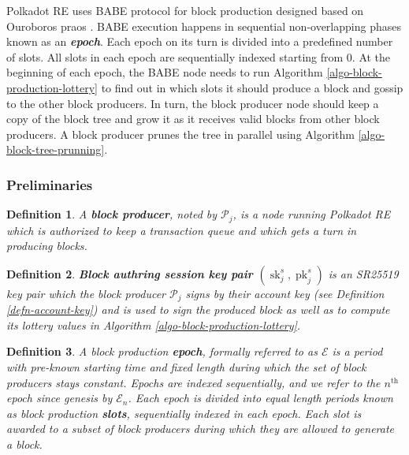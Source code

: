 \documentclass{article}
\newcommand{\tmem}[1]{{\em #1\/}}
\newcommand{\tmop}[1]{\ensuremath{\operatorname{#1}}}
\newcommand{\tmstrong}[1]{\textbf{#1}}
\newcommand{\tmtextbf}[1]{{\bfseries{#1}}}
\newcommand{\tmtextit}[1]{{\itshape{#1}}}
\newtheorem{definition}{Definition}
\providecommand{\tmem}[1]{\tmtextit{#1}}
\providecommand{\tmop}[1]{\ensuremath{\mathrm{#1}}}
\providecommand{\tmstrong}[1]{\tmtextbf{#1}}
\providecommand{\tmtextbf}[1]{\tmtextbf{#1}}
\providecommand{\tmtextit}[1]{\tmtextit{#1}}
\newtheorem{definition}{Definition}
\begin{document}
Polkadot RE uses BABE protocol {\cite{w3f_research_group_blind_2019}} for
block production designed based on Ouroboros praos
{\cite{david_ouroboros_2018}}. BABE execution happens in sequential
non-overlapping phases known as an {\tmstrong{{\tmem{epoch}}}}. Each epoch on
its turn is divided into a predefined number of slots. All slots in each epoch
are sequentially indexed starting from 0. At the beginning of each epoch, the
BABE node needs to run Algorithm \ref{algo-block-production-lottery} to find
out in which slots it should produce a block and gossip to the other block
producers. In turn, the block producer node should keep a copy of the block
tree and grow it as it receives valid blocks from other block producers. A
block producer prunes the tree in parallel using Algorithm
\ref{algo-block-tree-prunning}.

\subsubsection{Preliminaries}

\begin{definition}
  A {\tmstrong{block producer}}, noted by $\mathcal{P}_j$, is a node running
  Polkadot RE which is authorized to keep a transaction queue and which gets a
  turn in producing blocks.
\end{definition}

\begin{definition}
  {\tmstrong{Block authring session key pair $(\tmop{sk}^s_j,
  \tmop{pk}^s_j)$}} is an SR25519 key pair which the block producer
  $\mathcal{P}_j$ signs by their account key (see Definition
  \ref{defn-account-key}) and is used to sign the produced block as well as to
  compute its lottery values in Algorithm \ref{algo-block-production-lottery}.
  
\end{definition}

\begin{definition}
  A block production {\tmstrong{epoch}}, formally referred to as $\mathcal{E}$
  is a period with pre-known starting time and fixed length during which the
  set of block producers stays constant. Epochs are indexed sequentially, and
  we refer to the $n^{\tmop{th}}$ epoch since genesis by $\mathcal{E}_n$. Each
  epoch is divided into equal length periods known as block production
  {\tmstrong{slots}}, sequentially indexed in each epoch. Each slot is awarded
  to a subset of block producers during which they are allowed to generate a
  block.
\end{definition}
\end{document}
